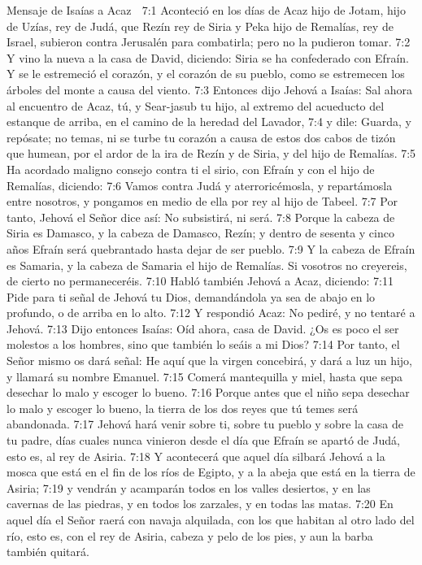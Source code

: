 Mensaje de Isaías a Acaz  

7:1 Aconteció en los días de Acaz hijo de Jotam, hijo de Uzías, rey de Judá, que Rezín rey de Siria y Peka hijo de Remalías, rey de Israel, subieron contra Jerusalén para combatirla; pero no la pudieron tomar. 
7:2 Y vino la nueva a la casa de David, diciendo: Siria se ha confederado con Efraín. Y se le estremeció el corazón, y el corazón de su pueblo, como se estremecen los árboles del monte a causa del viento.  
7:3 Entonces dijo Jehová a Isaías: Sal ahora al encuentro de Acaz, tú, y Sear-jasub tu hijo, al extremo del acueducto del estanque de arriba, en el camino de la heredad del Lavador,  
7:4 y dile: Guarda, y repósate; no temas, ni se turbe tu corazón a causa de estos dos cabos de tizón que humean, por el ardor de la ira de Rezín y de Siria, y del hijo de Remalías.  
7:5 Ha acordado maligno consejo contra ti el sirio, con Efraín y con el hijo de Remalías, diciendo:  
7:6 Vamos contra Judá y aterroricémosla, y repartámosla entre nosotros, y pongamos en medio de ella por rey al hijo de Tabeel.  
7:7 Por tanto, Jehová el Señor dice así: No subsistirá, ni será.  
7:8 Porque la cabeza de Siria es Damasco, y la cabeza de Damasco, Rezín; y dentro de sesenta y cinco años Efraín será quebrantado hasta dejar de ser pueblo.  
7:9 Y la cabeza de Efraín es Samaria, y la cabeza de Samaria el hijo de Remalías. Si vosotros no creyereis, de cierto no permaneceréis.  
7:10 Habló también Jehová a Acaz, diciendo:  
7:11 Pide para ti señal de Jehová tu Dios, demandándola ya sea de abajo en lo profundo, o de arriba en lo alto.  
7:12 Y respondió Acaz: No pediré, y no tentaré a Jehová.  
7:13 Dijo entonces Isaías: Oíd ahora, casa de David. ¿Os es poco el ser molestos a los hombres, sino que también lo seáis a mi Dios?  
7:14 Por tanto, el Señor mismo os dará señal: He aquí que la virgen concebirá, y dará a luz un hijo, y llamará su nombre Emanuel.  
7:15 Comerá mantequilla y miel, hasta que sepa desechar lo malo y escoger lo bueno.  
7:16 Porque antes que el niño sepa desechar lo malo y escoger lo bueno, la tierra de los dos reyes que tú temes será abandonada.  
7:17 Jehová hará venir sobre ti, sobre tu pueblo y sobre la casa de tu padre, días cuales nunca vinieron desde el día que Efraín se apartó de Judá, esto es, al rey de Asiria.  
7:18 Y acontecerá que aquel día silbará Jehová a la mosca que está en el fin de los ríos de Egipto, y a la abeja que está en la tierra de Asiria;  
7:19 y vendrán y acamparán todos en los valles desiertos, y en las cavernas de las piedras, y en todos los zarzales, y en todas las matas.  
7:20 En aquel día el Señor raerá con navaja alquilada, con los que habitan al otro lado del río, esto es, con el rey de Asiria, cabeza y pelo de los pies, y aun la barba también quitará.  
